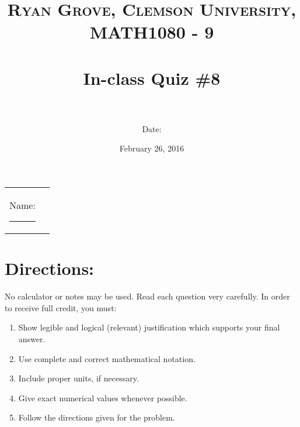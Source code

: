 \documentclass[paper=a4, fontsize=11pt]{scrartcl} %
\title{	
\normalfont \normalsize 
\textsc{Ryan Grove, Clemson University, MATH1080 - 9} \\ [25pt] %
\horrule{0.5pt} \\[0.4cm] %
\huge In-class Quiz \#8 \\ %
\horrule{2pt} \\[0.5cm] %
}
\author{Date:} %
\date{\normalsize February 26, 2016} %
\numberwithin{equation}{section} %
\numberwithin{figure}{section} %
\numberwithin{table}{section} %
\begin{document}
\maketitle %

\begin{flushleft}
\begin{tabular}{l l}
Name: \rule{3.2in}{.01cm}  & {}%
\end{tabular}
\end{flushleft}


\section*{\textbf{Directions:}}

No calculator or notes may be used.  Read each question very carefully.  In order to receive full credit, you must:
\begin{enumerate}
\item Show legible and logical (relevant) justification which supports your final answer.
\item Use complete and correct mathematical notation.
\item Include proper units, if necessary.
\item Give exact numerical values whenever possible.
\item Follow the directions given for the problem.
\end{enumerate}
\vspace{.1in}

\newpage
\end{document}
